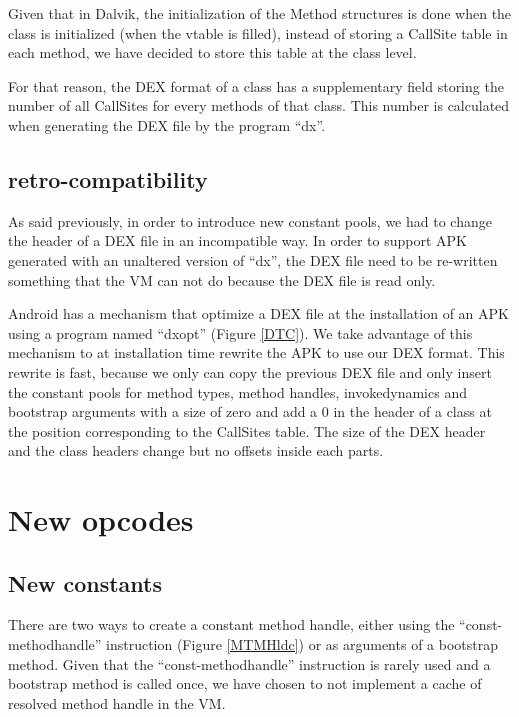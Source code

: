 \documentclass{sig-alternate}
\def \DALVIK{Dalvik\xspace}
\def \ANDROID{Android\xspace}
\begin{document}
    Given that in \DALVIK, the initialization of the Method structures is done when
    the class is initialized (when the vtable is filled), instead of storing a CallSite
    table in each method, we have decided to store this table at the class level.
    
    For that reason, the DEX format of a class has a supplementary field storing
    the number of all CallSites for every methods of that class. 
    This number is calculated when generating the DEX file by the program ``dx''.

  \subsection{retro-compatibility}
    \label{retro}

    As said previously, in order to introduce new constant pools, we had to change
    the header of a DEX file in an incompatible way.
    In order to support APK generated with an unaltered version of ``dx'',
    the DEX file need to be re-written something that the VM can not do
    because the DEX file is read only.

    \ANDROID has a mechanism that optimize a DEX file at the installation of
    an APK using a program named ``dxopt'' (Figure \ref{DTC}).
    We take advantage of this mechanism to at installation time rewrite the APK to use our DEX format.
    This rewrite is fast, because we only can copy the previous DEX file and only insert the
    constant pools for method types, method handles, invokedynamics and
    bootstrap arguments with a size of zero and add a 0 in the header of a class at the
    position corresponding to the CallSites table.
    The size of the DEX header and the class headers change but no offsets inside each parts.

\section{New opcodes}
\label{newConst}
  \subsection{New constants}

    There are two ways to create a constant method handle, either using the ``const-methodhandle''
    instruction (Figure \ref{MTMHldc}) or as arguments of a bootstrap method.
    Given that the ``const-methodhandle'' instruction is rarely used and
    a bootstrap method is called once, we have chosen to not implement a cache
    of resolved method handle in the VM.
\end{document}
